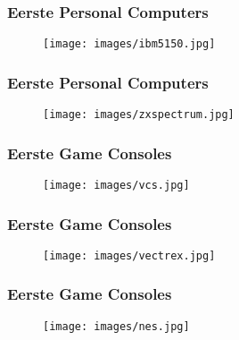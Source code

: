 \documentclass[aspectratio=43]{uva-inf-presentation}
\begin{document}

\begin{frame}
\frametitle{Eerste Personal Computers}

\begin{figure}
\texttt{[image: images/ibm5150.jpg]}
\end{figure}

\end{frame}


\begin{frame}
\frametitle{Eerste Personal Computers}

\begin{figure}
\texttt{[image: images/zxspectrum.jpg]}
\end{figure}

\end{frame}


\begin{frame}
\frametitle{Eerste Game Consoles}

\begin{figure}
\texttt{[image: images/vcs.jpg]}
\end{figure}

\end{frame}


\begin{frame}
\frametitle{Eerste Game Consoles}

\begin{figure}
\texttt{[image: images/vectrex.jpg]}
\end{figure}

\end{frame}


\begin{frame}
\frametitle{Eerste Game Consoles}

\begin{figure}
\texttt{[image: images/nes.jpg]}
\end{figure}

\end{frame}

\end{document}
